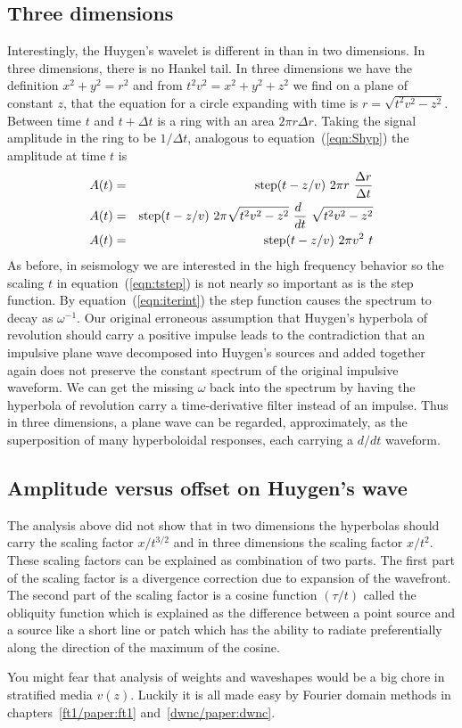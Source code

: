 {\subsection{Three dimensions}
Interestingly,
the Huygen's wavelet is different in 
than in two dimensions.
In three dimensions, there is no Hankel tail.
In three dimensions we have the definition
$x^2+y^2=r^2$ and
from $t^2v^2=x^2+y^2+z^2$ we find on a plane of constant $z$,
that the equation for a circle expanding with time is
$r=\sqrt{t^2v^2-z^2}$.
Between time $t$ and $t+\Delta t$ is a ring with an area
$2\pi r \Delta r$.
Taking the signal amplitude in the ring to be $1/\Delta t$,
analogous to equation~(\ref{eqn:Shyp}) the amplitude at time $t$ is
\begin{eqnarray}
A(t) &=&  {\rm step}(t-z/v) \ 
	2\pi r \ {\Delta r \over \Delta t }				\\
A(t) &=&  {\rm step}(t-z/v)  \ 
	2\pi \sqrt{t^2v^2-z^2}\ {d~\over dt}\ \sqrt{t^2v^2-z^2}		\\
A(t) &=&  {\rm step}(t-z/v) \ 2\pi v^2 \ t 
\label{eqn:tstep}
\end{eqnarray}
As before, in seismology
we are interested in the high frequency behavior
so the scaling $t$ in equation~(\ref{eqn:tstep})
is not nearly so important as is the step function.
By equation~(\ref{eqn:iterint})
the step function causes the spectrum to decay as $\omega^{-1}$.
Our original erroneous assumption
that Huygen's hyperbola of revolution
should carry a positive impulse
leads to the contradiction
that an impulsive plane wave
decomposed into Huygen's sources and added together again
does not preserve the constant spectrum
of the original impulsive waveform.
We can get the missing $\omega$ back into the spectrum
by having the hyperbola of revolution carry
a time-derivative filter instead of an impulse.
Thus in three dimensions,
a plane wave can be regarded, approximately,
as the superposition of many hyperboloidal responses,
each carrying a $d/dt$ waveform.

\subsection{Amplitude versus offset on Huygen's wave}
\sx{AVO}
The analysis above did not show that in two dimensions
the hyperbolas should carry the scaling factor $x/t^{3/2}$
and in three dimensions the scaling factor $x/t^2$.
These scaling factors can be explained
as combination of two parts.
The first part of the scaling factor is
a divergence correction due
to expansion of the wavefront.
The second part of the scaling factor is
a cosine function $(\tau/t)$ called the obliquity function
which is explained as the difference between a point source
and a source like a short line or patch which has the
ability to radiate preferentially along the direction
of the maximum of the cosine.
\par
You might fear that analysis of weights and waveshapes
would be a big chore in stratified media $v(z)$.
Luckily it is all made easy by Fourier domain
methods in chapters~\ref{ft1/paper:ft1} and~\ref{dwnc/paper:dwnc}.

}
